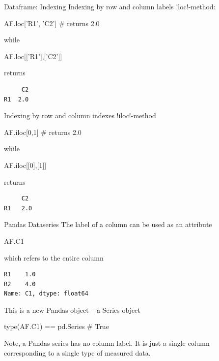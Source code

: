 \documentclass[hyperref={pdfpagelabels=false},table]{beamer}
\begin{document}
\begin{frame}[fragile]{Dataframe: Indexing}
Indexing by row and column labels \pyth!loc!-method:
\vfill
\begin{minipage}{0.45\textwidth}
\begin{python}
AF.loc['R1', 'C2']     # returns 2.0
\end{python}
\end{minipage} \vfill
while \vfill
\begin{minipage}{0.45\textwidth}
\begin{python}
AF.loc[['R1'],['C2']]
\end{python}
\end{minipage} \hfill
returns \hfill
\begin{minipage}{0.25\textwidth}
\begin{verbatim}
     C2
R1  2.0
\end{verbatim}
\end{minipage}
\end{frame}
\begin{frame}[fragile]{Indexing by row and column indexes \pyth!iloc!-method}
\vfill
\begin{minipage}{0.45\textwidth}
\begin{python}
AF.iloc[0,1]     # returns 2.0
\end{python}
\end{minipage} \vfill
while \vfill
\begin{minipage}{0.45\textwidth}
\begin{python}
AF.iloc[[0],[1]]
\end{python}
\end{minipage} \hfill
returns \hfill
\begin{minipage}{0.25\textwidth}
\begin{verbatim}
     C2
R1   2.0
\end{verbatim}
\end{minipage}
\end{frame}
\begin{frame}[fragile]{Pandas Dataseries}
The label of a column can be used as an attribute
\begin{python}
AF.C1
\end{python}
which refers to the entire column
\begin{verbatim}
R1    1.0
R2    4.0
Name: C1, dtype: float64
\end{verbatim}
\vfill
This is a new Pandas object -- a Series object
\begin{python}
type(AF.C1) == pd.Series  # True
\end{python}
Note, a Pandas series has no column label. It is just a single column corresponding
to a single type of measured data.
\end{frame}
\end{document}
